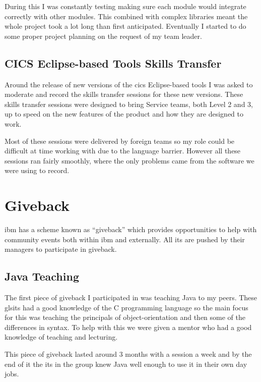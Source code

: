 \documentclass[a4paper,11pt]{report}
\begin{document}
During this I was constantly testing making sure each module would integrate correctly with other
modules. This combined with complex libraries meant the whole project took a lot long than first
anticipated. Eventually I started to do some proper project planning on the request of my team 
leader. \\

\subsection{CICS Eclipse-based Tools Skills Transfer}

Around the release of new versions of the \gls{cics} Eclipse-based tools I was asked to moderate
and record the skills transfer sessions for these new versions. These skills transfer sessions were
designed to bring Service teams, both Level 2 and 3, up to speed on the new features of the product
and how they are designed to work.

Most of these sessions were delivered by foreign teams so my role could be difficult at time
working with due to the language barrier. However all these sessions ran fairly smoothly, where
the only problems came from the software we were using to record. \\

\section{Giveback}

\gls{ibm} has a scheme known as ``giveback'' which provides opportunities to help with community
events both within \gls{ibm} and externally. All \gls{it}s are pushed by their managers to 
participate in giveback.

\subsection{Java Teaching}

The first piece of giveback I participated in was teaching Java to my peers. These gls{it}s had a
good knowledge of the C programming language so the main focus for this was teaching the principals
of object-orientation and then some of the differences in syntax. To help with this we were given a
mentor who had a good knowledge of teaching and lecturing.

This piece of giveback lasted around 3 months with a session a week and by the end of it the 
\gls{it}s in the group knew Java well enough to use it in their own day jobs.
\end{document}
